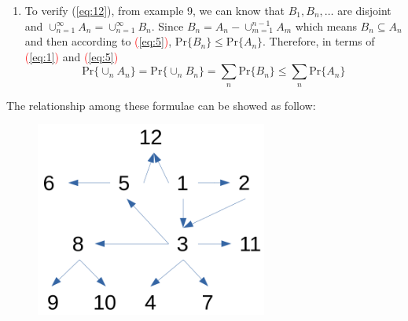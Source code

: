 \documentclass[UTF8]{article}
\begin{document}
\begin{enumerate}[1.]
\begin{equation*}
        \end{equation*}
        (\ref{eq:11}) is proved.
        \item To verify (\ref{eq:12}), from example 9, we can know that $B_1,B_n,\dots$ are disjoint and $\cup^\infty_{n=1}A_n=\cup^\infty_{n=1}B_n$. Since $B_n=A_n-\cup^{n-1}_{m=1}A_m$ which means $B_n\subseteq A_n$ and then according to \textcolor{red}{(\ref{eq:5})}, $\text{Pr}\{B_n\}\leq\text{Pr}\{A_n\}$. Therefore, in terms of \textcolor{red}{(\ref{eq:1})} and \textcolor{red}{(\ref{eq:5})}
        \begin{equation*}
            \text{Pr}\{\cup_nA_n\}=\text{Pr}\{\cup_nB_n\}=\sum_n\text{Pr}\{B_n\}\leq\sum_n\text{Pr}\{A_n\}
        \end{equation*}
    \end{enumerate}

    The relationship among these formulae can be showed as follow:
    \begin{figure}[h]
        \centering
        \includegraphics[width=3.0in]{relationship.png}
    \end{figure}
\end{document}
